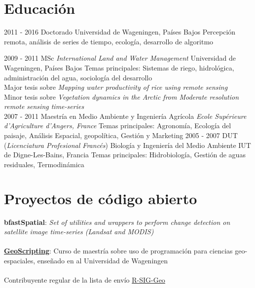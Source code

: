 \documentclass[spanish]{friggeri-cv}
\begin{document}
\section{Educación}
\begin{entrylist}
  \entry
    {2011 - 2016}
    {Doctorado}
    {Universidad de Wageningen, Países Bajos}
    {Percepción remota, análisis de series de tiempo, ecología, desarrollo de algoritmo\\}

  \entry
    {2009 - 2011}
    {MSc \emph{International Land and Water Management}}
    {Universidad de Wageningen, Países Bajos}
    {Temas principales: Sistemas de riego, hidrológica, administración del agua, sociología del desarrollo \\
    Major tesis sobre \emph{Mapping water productivity of rice using remote sensing}\\
    Minor tesis sobre \emph{Vegetation dynamics in the Arctic from Moderate resolution remote sensing time-series}\\}
  \entry
    {2007 - 2011}
    {Maestría en Medio Ambiente y Ingeniería Agrícola}
    {\emph{Ecole Supérieure d'Agriculture d'Angers, France}}
    {Temas principales: Agronomía, Ecología del paisaje, Análisis Espacial, geopolítica, Gestión y Marketing}
  \entry
    {2005 - 2007}
    {DUT (\textit{Licenciatura Profesional Francés}) Biología y Ingeniería del Medio Ambiente}
    {IUT de Digne-Les-Bains, Francia}
    {Temas principales: Hidrobiología, Gestión de aguas residuales, Termodinámica}
\end{entrylist}

\section{Proyectos de código abierto}
    \textbf{bfastSpatial}: \textit{Set of utilities and wrappers to perform change detection on satellite image time-series (Landsat and MODIS)}\\
    \\
    \href{http://geoscripting-wur.github.io/}{\textbf{GeoScripting}}: Curso de maestría sobre uso de programación para ciencias geo-espaciales, enseñado en al Universidad de Wageningen\\
    \\
    Contribuyente regular de la lista de envío \href{https://stat.ethz.ch/mailman/listinfo/r-sig-geo}{R-SIG-Geo}

\pagebreak

\end{document}
